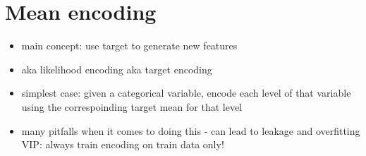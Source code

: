 \documentclass[a4paper]{report}
\begin{document}
\section{Mean encoding}
\begin{itemize}
  \item main concept: use target to generate new features
  \item aka likelihood encoding aka target encoding
  \item simplest case: given a categorical variable, encode each level of that variable using the correspoinding target mean for that level
  \item many pitfalls when it comes to doing this - can lead to leakage and overfitting
    \subitem VIP: always train encoding on train data only!
\end{itemize}
\end{document}
